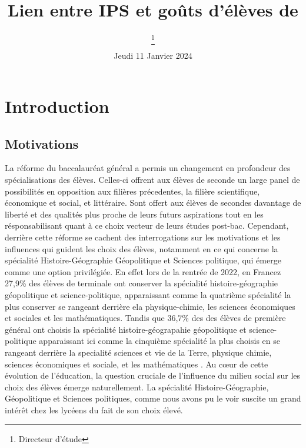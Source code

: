 \documentclass[a4paper, 11pt]{article}
\begin{document}
\title{Lien entre IPS et goûts d'élèves de}
\author{
   \and
   \and
    \thanks{Directeur d'étude}
} 
\date{Jeudi 11 Janvier 2024} 

\maketitle

\tableofcontents

\newpage

\section{Introduction}
\subsection{Motivations}
La réforme du baccalauréat général a permis un changement en profondeur des spécialisations des élèves. Celles-ci offrent aux élèves de seconde un large panel de possibilités en opposition aux 
filières précedentes, la filière scientifique, économique et social, et littéraire. Sont offert aux élèves de secondes davantage de liberté et des qualités plus proche de leurs futurs aspirations
tout en les résponsabilisant quant à ce choix vecteur de leurs études post-bac. Cependant, derrière cette réforme se cachent des interrogations 
sur les motivations et les influences qui guident les choix des élèves, notamment en ce qui concerne la spécialité Histoire-Géographie 
Géopolitique et Sciences politique, qui émerge comme une option privilégiée. En effet lors de la rentrée de 2022, en Francez 27,9\% des élèves de terminale
ont conserver la spécialité histoire-géographie géopolitique et science-politique, apparaissant comme la quatrième spécialité la plus conserver se rangeant
derrière ela physique-chimie, les sciences économiques et sociales et les mathématiques. Tandis que 36,7\% des des élèves de première général ont choisis 
la spécialité histoire-géograpahie géopolitique et science-politique apparaissant ici comme la cinquième spécialité la plus choisis en se rangeant derrière 
la specialité sciences et vie de la Terre, physique chimie, sciences économiques et sociale, et les mathématiques \cite{dauphin:halshs-04017371}. Au cœur 
de cette évolution de l'éducation, la question cruciale de l'influence du milieu social sur les choix des élèves émerge naturellement. La spécialité 
Histoire-Géographie, Géopolitique et Sciences politiques, comme nous avons pu le voir suscite un grand intérêt chez les lycéens du fait de son choix élevé.
\end{document}
